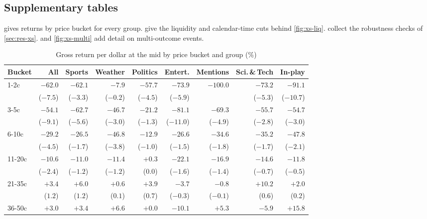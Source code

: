 \subsection{Supplementary tables}\label{app:xs-tables}

 gives returns by price bucket for every group. 
give the liquidity and calendar-time cuts behind \cref{fig:xs-liq}. 
collect the robustness checks of \cref{sec:res-xs}.  and \cref{fig:xs-multi}
add detail on multi-outcome events.

\begin{table}[htbp]
\centering
\begin{threeparttable}
\caption{Gross return per dollar at the mid by price bucket and group (\%)}\label{tab:xs-bucket-group}
\scriptsize
\setlength{\tabcolsep}{3pt}
\begin{tabular}{@{}lrrrrrrrr@{}}
\toprule
Bucket & All & Sports & Weather & Politics & Entert. & Mentions & Sci.\,\&\,Tech & In-play \\
\midrule
1-2c & $-62.0$ & $-62.1$ & $-7.9$ & $-57.7$ & $-73.9$ & $-100.0$ & $-73.2$ & $-91.1$ \\
 & ($-7.5$) & ($-3.3$) & ($-0.2$) & ($-4.5$) & ($-5.9$) &  & ($-5.3$) & ($-10.7$) \\[1pt]
3-5c & $-54.1$ & $-62.7$ & $-46.7$ & $-21.2$ & $-81.1$ & $-69.3$ & $-55.7$ & $-54.7$ \\
 & ($-9.1$) & ($-5.6$) & ($-3.0$) & ($-1.3$) & ($-11.0$) & ($-4.9$) & ($-2.8$) & ($-3.0$) \\[1pt]
6-10c & $-29.2$ & $-26.5$ & $-46.8$ & $-12.9$ & $-26.6$ & $-34.6$ & $-35.2$ & $-47.8$ \\
 & ($-4.5$) & ($-1.7$) & ($-3.8$) & ($-1.0$) & ($-1.5$) & ($-1.8$) & ($-1.7$) & ($-2.1$) \\[1pt]
11-20c & $-10.6$ & $-11.0$ & $-11.4$ & $+0.3$ & $-22.1$ & $-16.9$ & $-14.6$ & $-11.8$ \\
 & ($-2.4$) & ($-1.2$) & ($-1.2$) & ($0.0$) & ($-1.6$) & ($-1.4$) & ($-0.7$) & ($-0.5$) \\[1pt]
21-35c & $+3.4$ & $+6.0$ & $+0.6$ & $+3.9$ & $-3.7$ & $-0.8$ & $+10.2$ & $+2.0$ \\
 & ($1.2$) & ($1.2$) & ($0.1$) & ($0.7$) & ($-0.3$) & ($-0.1$) & ($0.6$) & ($0.2$) \\[1pt]
36-50c & $+3.0$ & $+3.4$ & $+6.6$ & $+0.0$ & $-10.1$ & $+5.3$ & $-5.9$ & $+15.8$ \\

\end{tabular}
\end{threeparttable}
\end{table}
